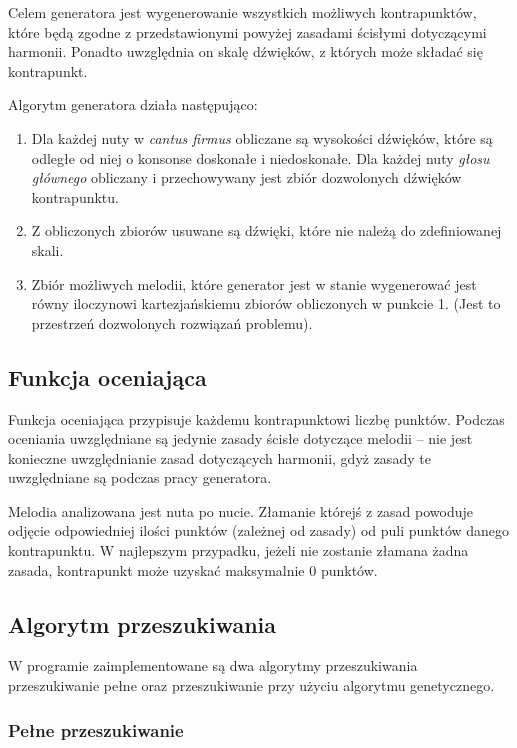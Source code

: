 \documentclass{article}
\begin{document}
Celem generatora jest wygenerowanie wszystkich możliwych kontrapunktów, które będą zgodne z przedstawionymi powyżej zasadami ścisłymi dotyczącymi harmonii.
Ponadto uwzględnia on skalę dźwięków, z których może składać się kontrapunkt.

Algorytm generatora działa następująco:
\begin{enumerate}
\item Dla każdej nuty w \emph{cantus firmus} obliczane są wysokości dźwięków, które są odległe od niej o konsonse doskonałe i niedoskonałe. Dla każdej nuty \emph{głosu głównego} obliczany i przechowywany jest zbiór dozwolonych dźwięków kontrapunktu.
\item Z obliczonych zbiorów usuwane są dźwięki, które nie należą do zdefiniowanej skali.
\item Zbiór możliwych melodii, które generator jest w stanie wygenerować jest równy iloczynowi kartezjańskiemu zbiorów obliczonych w punkcie 1. (Jest to przestrzeń dozwolonych rozwiązań problemu).
\end{enumerate}

\subsection{Funkcja oceniająca}

Funkcja oceniająca przypisuje każdemu kontrapunktowi liczbę punktów. Podczas oceniania uwzględniane są jedynie zasady ścisłe dotyczące melodii -- nie jest konieczne uwzględnianie zasad dotyczących harmonii, gdyż zasady te uwzględniane są podczas pracy generatora.

Melodia analizowana jest nuta po nucie. Złamanie którejś z zasad powoduje odjęcie odpowiedniej ilości punktów (zależnej od zasady) od puli punktów danego kontrapunktu. W najlepszym przypadku, jeżeli nie zostanie złamana żadna zasada, kontrapunkt może uzyskać maksymalnie $0$ punktów.

\subsection{Algorytm przeszukiwania}

W programie zaimplementowane są dwa algorytmy przeszukiwania przeszukiwanie pełne oraz przeszukiwanie przy użyciu algorytmu genetycznego.

\subsubsection{Pełne przeszukiwanie}
\end{document}
